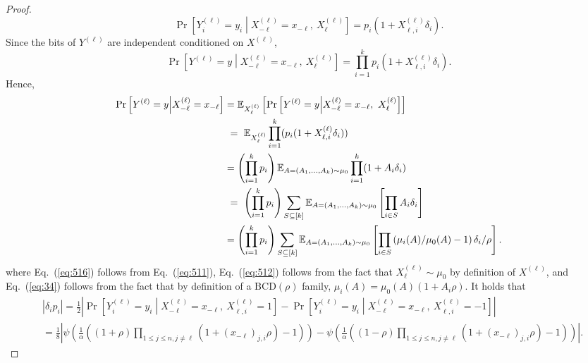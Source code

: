 \documentclass[final, 12pt]{colt2018}
\providecommand{\BCD}{\mathrm{BCD}}
\renewcommand{\eqref}[1]{Eq.~(\ref{#1})}
\begin{document}
\begin{proof}
\begin{equation*} 
\Pr\left[Y^{(\ell)}_i = y_i \middle| X^{(\ell)}_{-\ell} = x_{-\ell},\ X^{(\ell)}_\ell \right]
= p_i\left(1 + X_{\ell,i}^{(\ell)} \delta_i \right).
\end{equation*}
Since the bits of $Y^{(\ell)}$ are independent conditioned on $X^{(\ell)}$,
\begin{equation} \label{eq:511} 
\Pr\left[Y^{(\ell)} = y \middle| X^{(\ell)}_{-\ell} = x_{-\ell},\ X^{(\ell)}_\ell \right]
= \prod_{i=1}^k p_i\left(1 + X_{\ell,i}^{(\ell)} \delta_i \right).
\end{equation}
Hence,
\begin{align}
\Pr\left[Y^{(\ell)} = y \middle| X^{(\ell)}_{-\ell} = x_{-\ell}\right]
&= \mathbb{E}_{X^{(\ell)}_\ell} \left[ \Pr\left[Y^{(\ell)} = y \middle| X^{(\ell)}_{-\ell} = x_{-\ell},\ X^{(\ell)}_\ell \right] \right] \notag\\
&~=~ \mathbb{E}_{X^{(\ell)}_\ell} \prod_{i=1}^k (p_i (1 + X^{(\ell)}_{\ell,i} \delta_i)) \label{eq:516}\\
&= \left(\prod_{i=1}^k p_i \right) \mathbb{E}_{A =(A_1, \dots, A_k) \sim \mu_0} \prod_{i=1}^k (1 + A_i \delta_i)\label{eq:512} \\
&~=~ \left(\prod_{i=1}^k p_i \right) \sum_{S \subseteq [k]}  \mathbb{E}_{A=(A_1, \dots, A_k) \sim \mu_0} \left[\prod_{i\in S} A_i \delta_i \right] \nonumber\\
&= \left(\prod_{i=1}^k p_i \right) \sum_{S \subseteq [k]} \mathbb{E}_{A=(A_1, \dots, A_k) \sim \mu_0} \left[\prod_{i\in S} \left(\mu_i(A)/\mu_0(A) - 1\right) \delta_i/\rho \right].  \label{eq:34}
\end{align}
where \eqref{eq:516} follows from \eqref{eq:511}, \eqref{eq:512} follows from the fact that $X_\ell^{(\ell)} \sim \mu_0$ by definition of $X^{(\ell)}$, and \eqref{eq:34} follows from the fact that by definition of a $\BCD(\rho)$ family,  $\mu_i(A) = \mu_0(A)(1 + A_i \rho)$.
It holds that
\begin{align} 
& \left| \delta_i p_i \right|
= \frac{1}{2} \left\lvert \Pr\left[Y^{(\ell)}_i = y_i \middle| X^{(\ell)}_{-\ell} = x_{-\ell},\ X^{(\ell)}_{\ell,i} = 1 \right]
- \Pr\left[Y^{(\ell)}_i = y_i \middle| X^{(\ell)}_{-\ell} = x_{-\ell},\ X^{(\ell)}_{\ell,i}=-1\right]\right\rvert \label{eq:513} \\
&= \frac{1}{8} \left\lvert \psi \left( \frac{1}{\alpha} \left( (1 + \rho)\prod_{1 \le j \le n, j \ne \ell} (1 + (x_{-\ell})_{j,i} \rho) -1 \right) \right)
- \psi \left( \frac{1}{\alpha} \left( (1 - \rho)\prod_{1 \le j \le n, j \ne \ell} (1 + (x_{-\ell})_{j,i} \rho) -1 \right) \right) \right\rvert. \label{eq:145}

\end{align}
\end{proof}
\end{document}
